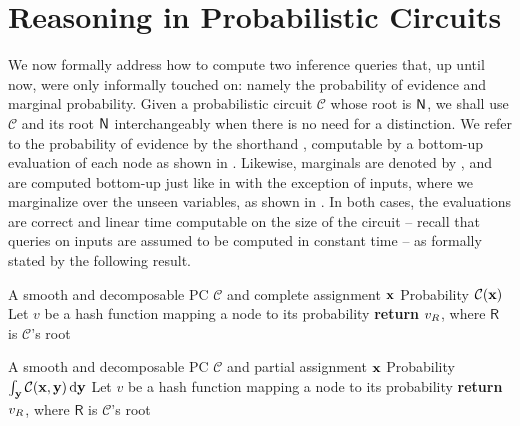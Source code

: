 \section{Reasoning in Probabilistic Circuits}
\label{sec:inf}

We now formally address how to compute two inference queries that, up until now, were only
informally touched on: namely the probability of evidence and marginal probability. Given a
probabilistic circuit $\mathcal{C}$ whose root is $\operatorname{\textup{\textsf{N}}}$, we shall use $\mathcal{C}$ and its root
$\operatorname{\textup{\textsf{N}}}$ interchangeably when there is no need for a distinction. We refer to the probability of
evidence by the shorthand \evi{}, computable by a bottom-up evaluation of each node as shown in
. Likewise, marginals are denoted by \mar{}, and are computed bottom-up just like in
\evi{} with the exception of inputs, where we marginalize over the unseen variables, as shown in
. In both cases, the evaluations are correct and linear time computable on the size
of the circuit -- recall that queries on inputs are assumed to be computed in constant time -- as
formally stated by the following result.

\begin{algorithm}[t]
  \caption{\evi}\label{alg:evi}
  \begin{algorithmic}[1]
    \Require A smooth and decomposable PC $\mathcal{C}$ and complete assignment $\mathbf{x}$
    \Ensure Probability $\mathcal{C}(\mathbf{x})$
    \State Let $v$ be a hash function mapping a node to its probability
    \EndFor%
    \State \textbf{return} $v_{\normalfont{R}}$, where $\textsf{R}$ is $\mathcal{C}$'s root
  \end{algorithmic}
\end{algorithm}
\begin{algorithm}[t]
  \caption{\mar}\label{alg:mar}
  \begin{algorithmic}[1]
    \Require A smooth and decomposable PC $\mathcal{C}$ and partial assignment $\mathbf{x}$
    \Ensure Probability $\int_{\mathbf{y}}\mathcal{C}(\mathbf{x},\mathbf{y})\mathop{}\!\mathrm{d}\mathbf{y}$
    \State Let $v$ be a hash function mapping a node to its probability
    \EndFor%
    \State \textbf{return} $v_{\normalfont{R}}$, where $\textsf{R}$ is $\mathcal{C}$'s root
  \end{algorithmic}
\end{algorithm}

